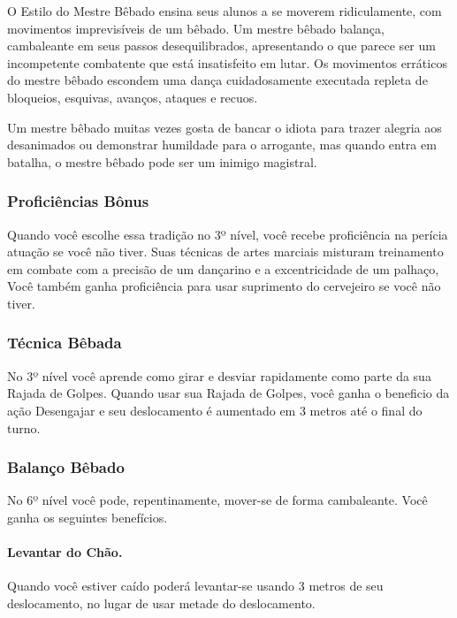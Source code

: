 \begin{multicols}{2}
O Estilo do Mestre Bêbado ensina seus alunos a se moverem ridiculamente, com
movimentos imprevisíveis de um bêbado. Um mestre bêbado balança, cambaleante em
seus passos desequilibrados, apresentando o que parece ser um incompetente
combatente que está insatisfeito em lutar. Os movimentos erráticos do mestre
bêbado escondem uma dança cuidadosamente executada repleta de bloqueios,
esquivas, avanços, ataques e recuos.

Um mestre bêbado muitas vezes gosta de bancar o idiota para trazer alegria aos
desanimados ou demonstrar humildade para o arrogante, mas quando entra em
batalha, o mestre bêbado pode ser um inimigo magistral.

\subsubsection*{Proficiências Bônus}%
\label{ssub:proficiencias_bonus}

Quando você escolhe essa tradição no 3º nível, você recebe proficiência na
perícia atuação se você não tiver. Suas técnicas de artes marciais misturam
treinamento em combate com a precisão de um dançarino e a excentricidade de um
palhaço, Você também ganha proficiência para usar suprimento do cervejeiro se
você não tiver.

\subsubsection*{Técnica Bêbada}%
\label{ssub:tecnica_bebada}

No 3º nível você aprende como girar e desviar rapidamente como parte da sua
Rajada de Golpes. Quando usar sua Rajada de Golpes, você ganha o beneficio da
ação Desengajar e seu deslocamento é aumentado em 3 metros até o final do turno.

\subsubsection*{Balanço Bêbado}%
\label{ssub:balanco_bebado}

No 6º nível você pode, repentinamente, mover-se de forma cambaleante. Você ganha
os seguintes benefícios.

\paragraph{Levantar do Chão.}%
Quando você estiver caído poderá levantar-se usando 3 metros de seu
deslocamento, no lugar de usar metade do deslocamento.


\end{multicols}
